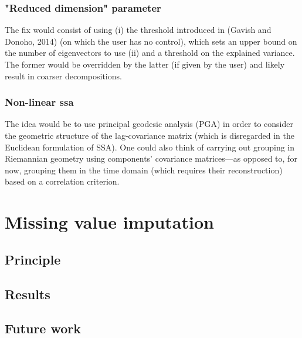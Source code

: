 \documentclass{article}
\begin{document}
\subsubsection{"Reduced dimension" parameter}
The fix would consist of using (i) the threshold introduced in (Gavish and Donoho, 2014) (on which the user has no control), which sets an upper bound on the number of eigenvectors to use (ii) and a threshold on the explained variance. The former would be overridden by the latter (if given by the user) and likely result in coarser decompositions.


\subsubsection{Non-linear ssa}
The idea would be to use principal geodesic analysis (PGA) in order to consider the geometric structure of the lag-covariance matrix (which is disregarded in the Euclidean formulation of SSA). One could also think of carrying out grouping in Riemannian geometry using components' covariance matrices---as opposed to, for now, grouping them in the time domain (which requires their reconstruction) based on a correlation criterion. 

\section{Missing value imputation}
\subsection{Principle}
\subsection{Results}
\subsection{Future work}
\end{document}
